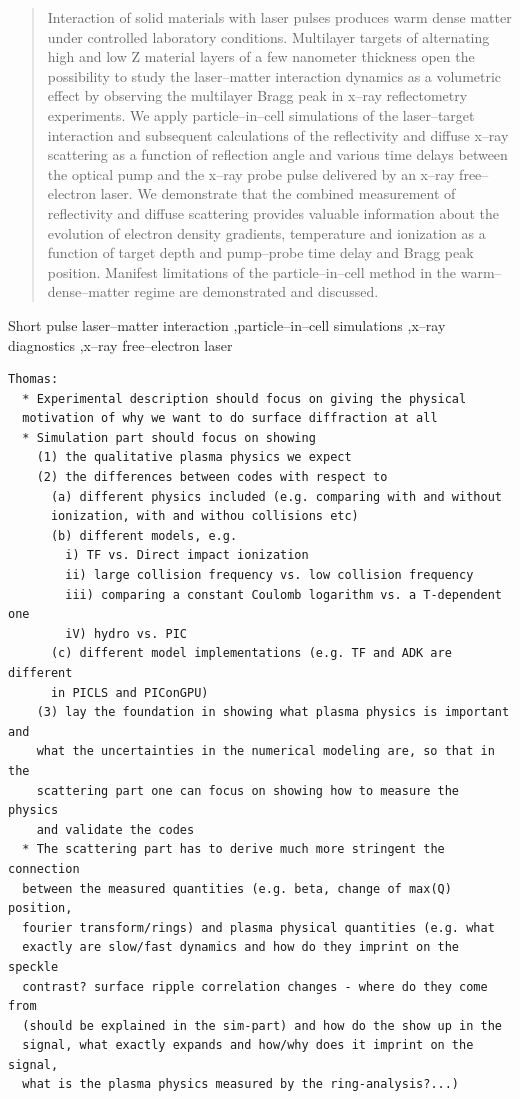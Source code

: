 \documentclass[preprint, 12pt]{elsarticle}
\begin{document}
\begin{frontmatter}
\begin{abstract}
  Interaction of solid materials with laser pulses
  produces warm dense matter under controlled laboratory conditions.
  Multilayer targets of alternating high and low Z material layers of a few
  nanometer thickness open the possibility
  to study the laser--matter interaction dynamics as a volumetric effect by
  observing the multilayer Bragg peak in x--ray reflectometry experiments.
  We apply particle--in--cell simulations of
  the laser--target interaction and subsequent calculations of
  the reflectivity and diffuse x--ray scattering as a
  function of reflection angle and various time delays between the optical pump
  and the x--ray probe pulse delivered by an x--ray free--electron laser.
  We demonstrate that the combined measurement of reflectivity and
  diffuse scattering provides valuable information about the evolution of
  electron density gradients, temperature and ionization as a function of target
  depth and pump--probe time delay and Bragg peak position. Manifest limitations
  of the particle--in--cell method in the warm--dense--matter regime are
  demonstrated and discussed.
\end{abstract}
%
\begin{keyword}
Short pulse laser--matter interaction \sep particle--in--cell simulations \sep x--ray
diagnostics \sep x--ray free--electron laser
\end{keyword}
\end{frontmatter}
%
\linenumbers
\begin{verbatim}
Thomas:
  * Experimental description should focus on giving the physical
  motivation of why we want to do surface diffraction at all
  * Simulation part should focus on showing
    (1) the qualitative plasma physics we expect
    (2) the differences between codes with respect to
      (a) different physics included (e.g. comparing with and without
      ionization, with and withou collisions etc)
      (b) different models, e.g.
        i) TF vs. Direct impact ionization
        ii) large collision frequency vs. low collision frequency
        iii) comparing a constant Coulomb logarithm vs. a T-dependent one
        iV) hydro vs. PIC
      (c) different model implementations (e.g. TF and ADK are different
      in PICLS and PIConGPU)
    (3) lay the foundation in showing what plasma physics is important and
    what the uncertainties in the numerical modeling are, so that in the
    scattering part one can focus on showing how to measure the physics
    and validate the codes
  * The scattering part has to derive much more stringent the connection
  between the measured quantities (e.g. beta, change of max(Q) position,
  fourier transform/rings) and plasma physical quantities (e.g. what
  exactly are slow/fast dynamics and how do they imprint on the speckle
  contrast? surface ripple correlation changes - where do they come from
  (should be explained in the sim-part) and how do the show up in the
  signal, what exactly expands and how/why does it imprint on the signal,
  what is the plasma physics measured by the ring-analysis?...)
\end{verbatim}
\end{document}
